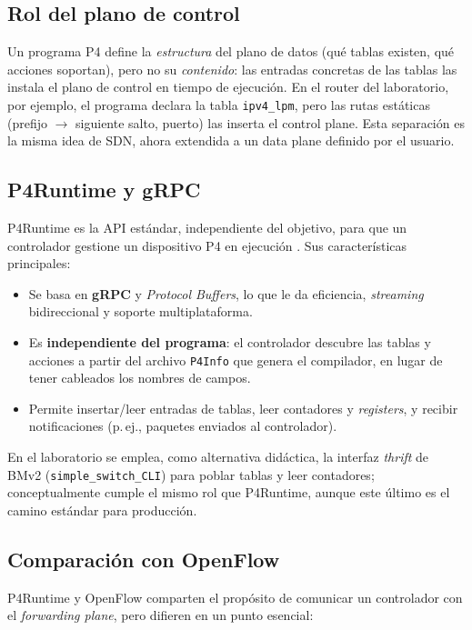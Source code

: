 \documentclass[conference,onecolumn,10pt]{IEEEtran}
\begin{document}
\subsection{Rol del plano de control}
Un programa P4 define la \emph{estructura} del plano de datos (qué tablas
existen, qué acciones soportan), pero no su \emph{contenido}: las entradas
concretas de las tablas las instala el plano de control en tiempo de ejecución.
En el router del laboratorio, por ejemplo, el programa declara la tabla
\texttt{ipv4\_lpm}, pero las rutas estáticas (prefijo $\rightarrow$ siguiente
salto, puerto) las inserta el control plane. Esta separación es la misma idea de
SDN, ahora extendida a un data plane definido por el usuario.

\subsection{P4Runtime y gRPC}
P4Runtime es la API estándar, independiente del objetivo, para que un controlador
gestione un dispositivo P4 en ejecución \cite{p4runtime}. Sus características
principales:

\begin{itemize}
\item Se basa en \textbf{gRPC} y \emph{Protocol Buffers}, lo que le da eficiencia,
\emph{streaming} bidireccional y soporte multiplataforma.
\item Es \textbf{independiente del programa}: el controlador descubre las tablas y
acciones a partir del archivo \texttt{P4Info} que genera el compilador, en lugar
de tener cableados los nombres de campos.
\item Permite insertar/leer entradas de tablas, leer contadores y \emph{registers},
y recibir notificaciones (p.\,ej., paquetes enviados al controlador).
\end{itemize}

En el laboratorio se emplea, como alternativa didáctica, la interfaz
\emph{thrift} de BMv2 (\texttt{simple\_switch\_CLI}) para poblar tablas y leer
contadores; conceptualmente cumple el mismo rol que P4Runtime, aunque este último
es el camino estándar para producción.

\subsection{Comparación con OpenFlow}
P4Runtime y OpenFlow comparten el propósito de comunicar un controlador con el
\emph{forwarding plane}, pero difieren en un punto esencial:
\end{document}
